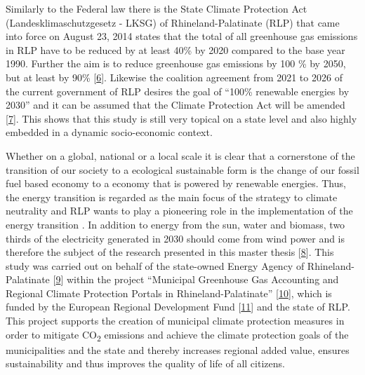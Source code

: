 \documentclass[a4paper,11pt]{article}
\begin{document}
Similarly to the Federal law there is the State Climate Protection Act (Landesklimaschutzgesetz - LKSG) of Rhineland-Palatinate (RLP) that came into force on August 23, 2014 states that the total of all greenhouse gas emissions in RLP have to be reduced by at least 40\% by 2020 compared to the base year 1990. Further the aim is to reduce greenhouse gas emissions by 100 \% by 2050, but at least by 90\% {[}\protect\hyperlink{ref-RheinlandPfalz.19.08.2014}{6}{]}. Likewise the coalition agreement from 2021 to 2026 of the current government of RLP desires the goal of ``100\% renewable energies by 2030'' and it can be assumed that the Climate Protection Act will be amended {[}\protect\hyperlink{ref-SPDGruneFDP.2021}{7}{]}. This shows that this study is still very topical on a state level and also highly embedded in a dynamic socio-economic context.

Whether on a global, national or a local scale it is clear that a cornerstone of the transition of our society to a ecological sustainable form is the change of our fossil fuel based economy to a economy that is powered by renewable energies. Thus, the energy transition is regarded as the main focus of the strategy to climate neutrality and RLP wants to play a pioneering role in the implementation of the energy transition . In addition to energy from the sun, water and biomass, two thirds of the electricity generated in 2030 should come from wind power and is therefore the subject of the research presented in this master thesis {[}\protect\hyperlink{ref-LandesregierungRheinlandPfalz.2021}{8}{]}. This study was carried out on behalf of the state-owned Energy Agency of Rhineland-Palatinate {[}\protect\hyperlink{ref-EnergieagenturRheinlandPfalz.2021}{9}{]} within the project ``Municipal Greenhouse Gas Accounting and Regional Climate Protection Portals in Rhineland-Palatinate'' {[}\protect\hyperlink{ref-KomBiReK.2021}{10}{]}, which is funded by the European Regional Development Fund {[}\protect\hyperlink{ref-EuropeanRegionalDevelopmentFund.2021}{11}{]} and the state of RLP. This project supports the creation of municipal climate protection measures in order to mitigate CO\textsubscript{2} emissions and achieve the climate protection goals of the municipalities and the state and thereby increases regional added value, ensures sustainability and thus improves the quality of life of all citizens.
\end{document}
